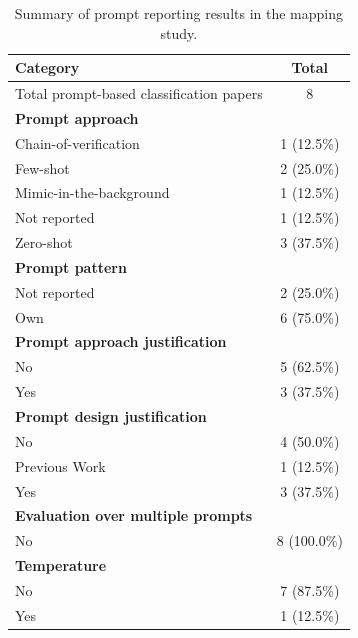 \documentclass[a4paper]{article}
\begin{document}
\begin{table}[H]
	\centering
	\captionsetup{justification=centering}
	\caption{Summary of prompt reporting results in the mapping study.}
	\begin{tabularx}{0.7\textwidth}{|X|c|}
		\hline
		\textbf{Category} & \textbf{Total} \\
		\hline
		Total prompt-based classification papers & 8 \\
		\hline
		\textbf{Prompt approach} & \\
		\hspace{3mm} Chain-of-verification & 1 (12.5\%)  \\
		\hspace{3mm} Few-shot & 2 (25.0\%)  \\
		\hspace{3mm} Mimic-in-the-background & 1 (12.5\%) \\
		\hspace{3mm} Not reported & 1 (12.5\%) \\
		\hspace{3mm} Zero-shot & 3 (37.5\%)  \\
		\textbf{Prompt pattern} &\\
		\hspace{3mm} Not reported & 2 (25.0\%)\\
		\hspace{3mm} Own & 6 (75.0\%) \\
		\textbf{Prompt approach justification} &\\
		\hspace{3mm} No & 5 (62.5\%)  \\
		\hspace{3mm} Yes & 3 (37.5\%)  \\
		\textbf{Prompt design justification} & \\
		\hspace{3mm} No & 4 (50.0\%)  \\
		\hspace{3mm} Previous Work & 1 (12.5\%) \\
		\hspace{3mm} Yes & 3 (37.5\%)  \\
		\textbf{Evaluation over multiple prompts} &\\
		\hspace{3mm} No & 8 (100.0\%) \\
		\textbf{Temperature} & \\
		\hspace{3mm} No & 7 (87.5\%) \\
		\hspace{3mm} Yes & 1 (12.5\%) \\
		\hline
	\end{tabularx}
	\label{table:prompt_results}
\end{table}
\end{document}
